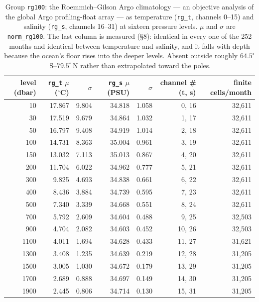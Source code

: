 \documentclass[10pt]{article}
\newcommand{\code}[1]{\texttt{#1}}
\begin{document}
\begin{table}[h]
\centering\setlength{\tabcolsep}{5pt}\footnotesize
\begin{tabular}{@{}rrrrrrr@{}}
\toprule
level (dbar) & \code{rg\_t} $\mu$ ($^\circ$C) & $\sigma$ & \code{rg\_s} $\mu$ (PSU) & $\sigma$ & channel \# (t, s) & finite cells/month \\
\midrule
10 & 17.867 & 9.804 & 34.818 & 1.058 & 0, 16 & 32,611 \\
30 & 17.519 & 9.679 & 34.864 & 1.032 & 1, 17 & 32,611 \\
50 & 16.797 & 9.408 & 34.919 & 1.014 & 2, 18 & 32,611 \\
100 & 14.731 & 8.363 & 35.004 & 0.961 & 3, 19 & 32,611 \\
150 & 13.032 & 7.113 & 35.013 & 0.867 & 4, 20 & 32,611 \\
200 & 11.704 & 6.022 & 34.962 & 0.777 & 5, 21 & 32,611 \\
300 & 9.825 & 4.693 & 34.838 & 0.661 & 6, 22 & 32,611 \\
400 & 8.436 & 3.884 & 34.739 & 0.595 & 7, 23 & 32,611 \\
500 & 7.340 & 3.339 & 34.668 & 0.551 & 8, 24 & 32,611 \\
700 & 5.792 & 2.609 & 34.604 & 0.488 & 9, 25 & 32,503 \\
900 & 4.704 & 2.082 & 34.603 & 0.452 & 10, 26 & 32,503 \\
1100 & 4.011 & 1.694 & 34.628 & 0.433 & 11, 27 & 31,621 \\
1300 & 3.408 & 1.235 & 34.639 & 0.219 & 12, 28 & 31,205 \\
1500 & 3.005 & 1.030 & 34.672 & 0.179 & 13, 29 & 31,205 \\
1700 & 2.689 & 0.888 & 34.697 & 0.149 & 14, 30 & 31,205 \\
1900 & 2.445 & 0.806 & 34.714 & 0.130 & 15, 31 & 31,205 \\
\bottomrule
\end{tabular}
\caption{Group \code{rg100}: the Roemmich--Gilson Argo climatology
\cite{rg} --- an objective analysis of the global Argo profiling-float array
--- as temperature (\code{rg\_t}, channels 0--15) and salinity (\code{rg\_s},
channels 16--31) at sixteen pressure levels. $\mu$ and $\sigma$ are
\code{norm\_rg100}. The last column is measured (\S8): identical in every one
of the 252 months and identical between temperature and salinity, and it falls
with depth because the ocean's floor rises into the deeper levels. Absent
outside roughly $64.5^\circ$\,S--$79.5^\circ$\,N rather than extrapolated
toward the poles.}
\end{table}
\end{document}

